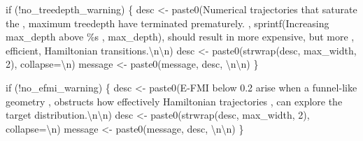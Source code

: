 \documentclass[
  letterpaper,
  DIV=11,
  numbers=noendperiod]{scrartcl}
\newenvironment{Shaded}{\begin{snugshade}}{\end{snugshade}}
\newcommand{\AttributeTok}[1]{\textcolor[rgb]{0.40,0.45,0.13}{#1}}
\newcommand{\ControlFlowTok}[1]{\textcolor[rgb]{0.00,0.23,0.31}{#1}}
\newcommand{\DecValTok}[1]{\textcolor[rgb]{0.68,0.00,0.00}{#1}}
\newcommand{\FunctionTok}[1]{\textcolor[rgb]{0.28,0.35,0.67}{#1}}
\newcommand{\NormalTok}[1]{\textcolor[rgb]{0.00,0.23,0.31}{#1}}
\newcommand{\OtherTok}[1]{\textcolor[rgb]{0.00,0.23,0.31}{#1}}
\newcommand{\SpecialCharTok}[1]{\textcolor[rgb]{0.37,0.37,0.37}{#1}}
\newcommand{\StringTok}[1]{\textcolor[rgb]{0.13,0.47,0.30}{#1}}
\begin{document}
\begin{Shaded}
\begin{Highlighting}[]
  \ControlFlowTok{if}\NormalTok{ (}\SpecialCharTok{!}\NormalTok{no\_treedepth\_warning) \{}
\NormalTok{    desc }\OtherTok{\textless{}{-}} \FunctionTok{paste0}\NormalTok{(}\StringTok{\textquotesingle{}Numerical trajectories that saturate the \textquotesingle{}}\NormalTok{,}
                   \StringTok{\textquotesingle{}maximum treedepth have terminated prematurely.  \textquotesingle{}}\NormalTok{,}
                   \FunctionTok{sprintf}\NormalTok{(}\StringTok{\textquotesingle{}Increasing max\_depth above \%s \textquotesingle{}}\NormalTok{, max\_depth),}
                   \StringTok{\textquotesingle{}should result in more expensive, but more \textquotesingle{}}\NormalTok{,}
                   \StringTok{\textquotesingle{}efficient, Hamiltonian transitions.}\SpecialCharTok{\textbackslash{}n\textbackslash{}n}\StringTok{\textquotesingle{}}\NormalTok{)}
\NormalTok{    desc }\OtherTok{\textless{}{-}} \FunctionTok{paste0}\NormalTok{(}\FunctionTok{strwrap}\NormalTok{(desc, max\_width, }\DecValTok{2}\NormalTok{), }\AttributeTok{collapse=}\StringTok{\textquotesingle{}}\SpecialCharTok{\textbackslash{}n}\StringTok{\textquotesingle{}}\NormalTok{)}
\NormalTok{    message }\OtherTok{\textless{}{-}} \FunctionTok{paste0}\NormalTok{(message, desc, }\StringTok{\textquotesingle{}}\SpecialCharTok{\textbackslash{}n\textbackslash{}n}\StringTok{\textquotesingle{}}\NormalTok{)}
\NormalTok{  \}}

  \ControlFlowTok{if}\NormalTok{ (}\SpecialCharTok{!}\NormalTok{no\_efmi\_warning) \{}
\NormalTok{    desc }\OtherTok{\textless{}{-}} \FunctionTok{paste0}\NormalTok{(}\StringTok{\textquotesingle{}E{-}FMI below 0.2 arise when a funnel{-}like geometry \textquotesingle{}}\NormalTok{,}
                   \StringTok{\textquotesingle{}obstructs how effectively Hamiltonian trajectories \textquotesingle{}}\NormalTok{,}
                   \StringTok{\textquotesingle{}can explore the target distribution.}\SpecialCharTok{\textbackslash{}n\textbackslash{}n}\StringTok{\textquotesingle{}}\NormalTok{)}
\NormalTok{    desc }\OtherTok{\textless{}{-}} \FunctionTok{paste0}\NormalTok{(}\FunctionTok{strwrap}\NormalTok{(desc, max\_width, }\DecValTok{2}\NormalTok{), }\AttributeTok{collapse=}\StringTok{\textquotesingle{}}\SpecialCharTok{\textbackslash{}n}\StringTok{\textquotesingle{}}\NormalTok{)}
\NormalTok{    message }\OtherTok{\textless{}{-}} \FunctionTok{paste0}\NormalTok{(message, desc, }\StringTok{\textquotesingle{}}\SpecialCharTok{\textbackslash{}n\textbackslash{}n}\StringTok{\textquotesingle{}}\NormalTok{)}
\NormalTok{  \}}


\end{Highlighting}
\end{Shaded}
\end{document}
